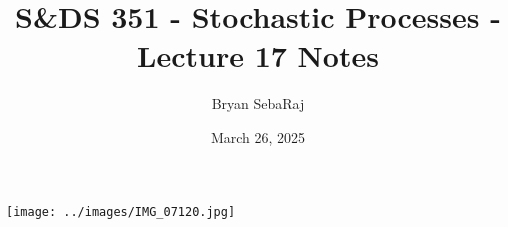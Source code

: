 \documentclass{article}
\title{S\&DS 351 - Stochastic Processes - Lecture 17 Notes}
\author{Bryan SebaRaj}
\date{March 26, 2025}
\begin{document}
\maketitle


\texttt{[image: ../images/IMG\_07120.jpg]}
\end{document}
